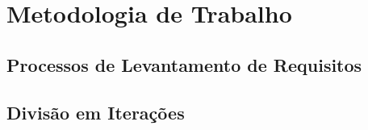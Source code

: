 \chapter{Metodologia de Trabalho}

\section{Processos de Levantamento de Requisitos}
\section{Divisão em Iterações}